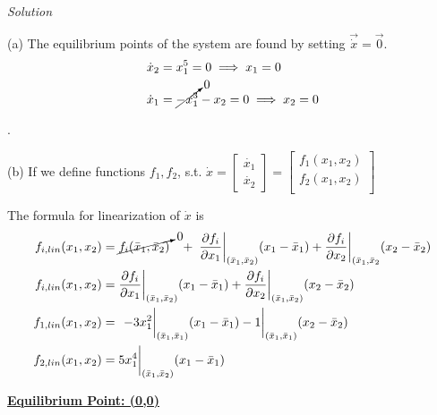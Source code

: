 \documentclass{article}
\begin{document}
  \noindent \textit{Solution} \newline \newline

  (a) The equilibrium points of the system are found by setting
  $\vec{\dot{x}}=\vec{0}$.
  \begin{align*}
    \dot{x}_2 &= x_1^5 = 0 \implies x_1=0 \\
    \dot{x}_1 &= \cancelto{0}{-x_1^3} - x_2 = 0 \implies x_2=0
  \end{align*}

  .\newline \newline

  (b) If we define functions $f_1, f_2$, s.t.
  $\dot{x} =
  \begin{bmatrix}
      \dot{x_1} \\
      \dot{x_2} 
  \end{bmatrix} =
  \begin{bmatrix}
      f_1(x_1, x_2) \\
      f_2(x_1, x_2) \\
  \end{bmatrix} $

  \vspace{5mm} The formula for linearization of $\dot{x}$ is
  \begin{align*}
    f_{i, lin}(x_1,x_2) &= \cancelto{0}{f_i(\bar{x}_1, \bar{x}_2)} \hspace{3.0mm} + \hspace{1.0mm}
    \frac{\partial f_i}{\partial x_1}\bigg|_{(\bar{x}_1, \bar{x}_2)}(x_1-\bar{x}_1) +
    \frac{\partial f_i}{\partial x_2}\bigg|_{(\bar{x}_1, \bar{x}_2}(x_2-\bar{x}_2) \\
    f_{i, lin}(x_1,x_2) &=
    \frac{\partial f_i}{\partial x_1}\bigg|_{(\bar{x}_1, \bar{x}_2)}(x_1-\bar{x}_1) +
    \frac{\partial f_i}{\partial x_2}\bigg|_{(\bar{x}_1, \bar{x}_2)}(x_2-\bar{x}_2) \\
    f_{1, lin}(x_1,x_2) &=
    \hspace{1.4mm} -3x_1^2\bigg|_{(\bar{x}_1, \bar{x}_1)}(x_1-\bar{x}_1) - 1 \bigg|_{(\bar{x}_1, \bar{x}_1)}(x_2-\bar{x}_2) \\
    f_{2, lin}(x_1,x_2) &= 5x_1^4\bigg|_{(\bar{x}_1, \bar{x}_2)}(x_1-\bar{x}_1) 
     \end{align*}

  \textbf{\underline{Equilibrium Point: (0,\hspace{0.8mm}0)}}
\end{document}
